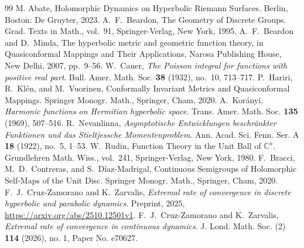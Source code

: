 \documentclass[10pt,a4paper]{amsart}
\numberwithin{equation}{section}
\begin{document}
\begin{thebibliography}{99}
 M. Abate, Holomorphic Dynamics on Hyperbolic Riemann Surfaces. Berlin, Boston: De Gruyter, 2023.
 A.~F.~Beardon, The Geometry of Discrete Groups. Grad. Texts in Math., vol.~91, Springer-Verlag, New York, 1995.
 A.~F.~Beardon and D.~Minda, The hyperbolic metric and geometric function theory, in Quasiconformal Mappings and Their Applications, Narosa Publishing House, New Delhi, 2007, pp.~9--56.
 W.~Cauer, \textit{The Poisson integral for functions with positive real part}. Bull. Amer. Math. Soc. \textbf{38} (1932), no.~10, 713--717.
 P.~Hariri, R.~Kl\'en, and M.~Vuorinen, Conformally Invariant Metrics and Quasiconformal Mappings. Springer Monogr. Math., Springer, Cham, 2020.
 A.~Kor\'anyi, \textit{Harmonic functions on Hermitian hyperbolic space}. Trans. Amer. Math. Soc. \textbf{135} (1969), 507--516.
 R.~Nevanlinna, \textit{Asymptotische Entwicklungen beschr\"ankter Funktionen und das Stieltjessche Momentenproblem}. Ann. Acad. Sci. Fenn. Ser. A \textbf{18} (1922), no.~5, 1--53.
 W.~Rudin, Function Theory in the Unit Ball of $\mathbb{C}^n$. Grundlehren Math. Wiss., vol.~241, Springer-Verlag, New York, 1980.
 F.~Bracci, M.~D.~Contreras, and S.~D\'iaz-Madrigal, Continuous Semigroups of Holomorphic Self-Maps of the Unit Disc. Springer Monogr. Math., Springer, Cham, 2020.
 F.~J.~Cruz-Zamorano and K.~Zarvalis, \textit{Extremal rate of convergence in discrete hyperbolic and parabolic dynamics}. Preprint, 2025, \url{https://arxiv.org/abs/2510.12501v1}.
 F.~J.~Cruz-Zamorano and K.~Zarvalis, \textit{Extremal rate of convergence in continuous dynamics}. J. Lond. Math. Soc. (2) \textbf{114} (2026), no. 1, Paper No. e70627.
\end{thebibliography}
\end{document}
